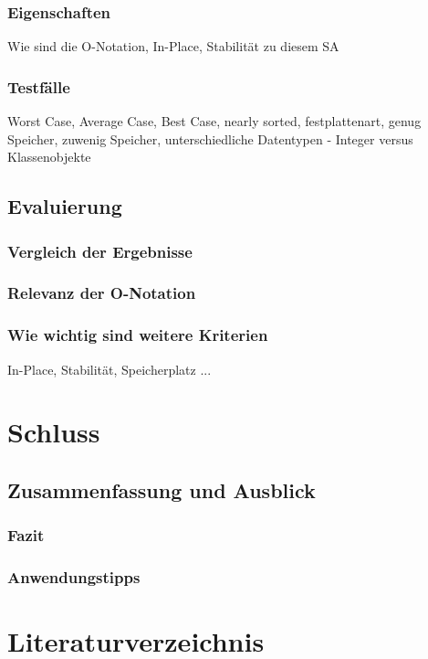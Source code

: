 \documentclass{article}
\begin{document}
\subsubsection{Eigenschaften}
Wie sind die O-Notation, In-Place, Stabilität zu diesem SA
\subsubsection{Testfälle}
Worst Case, Average Case, Best Case, nearly sorted, festplattenart, genug Speicher, zuwenig Speicher, unterschiedliche Datentypen - Integer versus Klassenobjekte


\subsection{Evaluierung}
\subsubsection{Vergleich der Ergebnisse}
\subsubsection{Relevanz der O-Notation}
\subsubsection{Wie wichtig sind weitere Kriterien}
In-Place, Stabilität, Speicherplatz ...

\section{Schluss}
\subsection{Zusammenfassung und Ausblick}
\subsubsection{Fazit}
\subsubsection{Anwendungstipps}

\section{Literaturverzeichnis}

%



\end{document}
